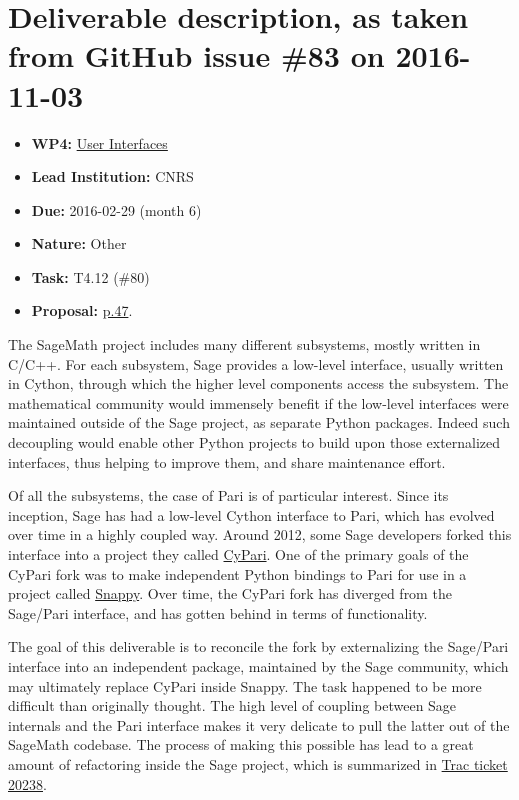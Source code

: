 \section{Deliverable description, as taken from GitHub issue \#83 on
2016-11-03}\label{deliverable-description-as-taken-from-github-issue-83-on-2016-11-03}

\begin{itemize}
\tightlist
\item
  \textbf{WP4:}
  \href{https://github.com/OpenDreamKit/OpenDreamKit/tree/master/WP4}{User
  Interfaces}
\item
  \textbf{Lead Institution:} CNRS
\item
  \textbf{Due:} 2016-02-29 (month 6)
\item
  \textbf{Nature:} Other
\item
  \textbf{Task:} T4.12 (\#80)
\item
  \textbf{Proposal:}
  \href{https://github.com/OpenDreamKit/OpenDreamKit/raw/master/Proposal/proposal-www.pdf}{p.47}.
\end{itemize}

The SageMath project includes many different subsystems, mostly written
in C/C++. For each subsystem, Sage provides a low-level interface,
usually written in Cython, through which the higher level components
access the subsystem. The mathematical community would immensely benefit
if the low-level interfaces were maintained outside of the Sage project,
as separate Python packages. Indeed such decoupling would enable other
Python projects to build upon those externalized interfaces, thus
helping to improve them, and share maintenance effort.

Of all the subsystems, the case of Pari is of particular interest. Since
its inception, Sage has had a low-level Cython interface to Pari, which
has evolved over time in a highly coupled way. Around 2012, some Sage
developers forked this interface into a project they called
\href{https://bitbucket.org/t3m/cypari/}{CyPari}. One of the primary
goals of the CyPari fork was to make independent Python bindings to Pari
for use in a project called
\href{https://bitbucket.org/t3m/snappy}{Snappy}. Over time, the CyPari
fork has diverged from the Sage/Pari interface, and has gotten behind in
terms of functionality.

The goal of this deliverable is to reconcile the fork by externalizing
the Sage/Pari interface into an independent package, maintained by the
Sage community, which may ultimately replace CyPari inside Snappy. The
task happened to be more difficult than originally thought. The high
level of coupling between Sage internals and the Pari interface makes it
very delicate to pull the latter out of the SageMath codebase. The
process of making this possible has lead to a great amount of
refactoring inside the Sage project, which is summarized in
\href{http://trac.sagemath.org/ticket/20238}{Trac ticket 20238}.

